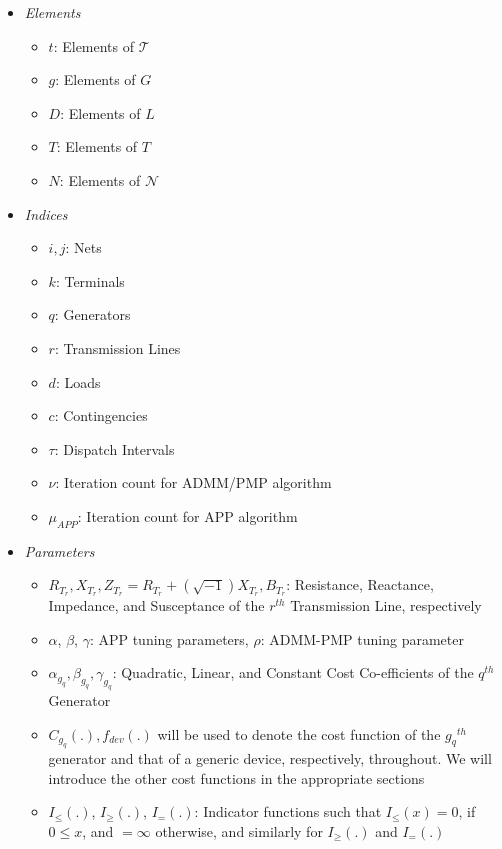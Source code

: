 \documentclass[preprint,12pt,3p]{elsarticle}
\begin{document}
\begin{itemize}
\begin{itemize}[label={}]
    \end{itemize}
    \item \textit{Elements}
    \begin{itemize}[label={}]
        \item $t$: Elements of $\mathcal{T}$
        \item $g$: Elements of $G$
        \item $D$: Elements of $L$
        \item $T$: Elements of $T$
        \item $N$: Elements of $\mathcal{N}$
    \end{itemize}
    \item \textit{Indices}
    \begin{itemize}[label={}]
        \item $i,j$: Nets
        \item $k$: Terminals
        \item $q$: Generators
        \item $r$: Transmission Lines
        \item $d$: Loads
        \item $c$: Contingencies
        \item $\tau$: Dispatch Intervals
        \item $\nu$: Iteration count for ADMM/PMP algorithm
        \item $\mu_{APP}$: Iteration count for APP algorithm
    \end{itemize}
    \item \textit{Parameters}
    \begin{itemize}[label={}]
        \item $R_{T_r}, X_{T_r}, Z_{T_r}=R_{T_r}+(\sqrt{-1})X_{T_r},  B_{T_r}$: Resistance, Reactance, Impedance, and Susceptance of the $r^{th}$ Transmission Line, respectively
        \item $\alpha$, $\beta$, $\gamma$: APP tuning parameters, $\rho$: ADMM-PMP tuning parameter
        \item $\alpha_{g_q}, \beta_{g_q}, \gamma_{g_q}$: Quadratic, Linear, and Constant Cost Co-efficients of the $q^{th}$ Generator
        \item $C_{g_q}(.), f_{dev}(.)$ will be used to denote the cost function of the ${g_q}^{th}$ generator and that of a generic device, respectively, throughout. We will introduce the other cost functions in the appropriate sections
        \item $I_{\leq}(.)$, $I_{\geq}(.)$, $ I_{=}(.)$: Indicator functions such that $I_{\leq}(x)=0$, if $0\leq x$, and $=\infty$ otherwise, and similarly for $I_{\geq}(.)$ and $ I_{=}(.)$ 

\end{itemize}
\end{itemize}
\end{document}
